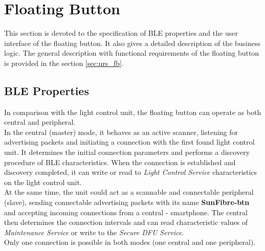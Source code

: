             
            \begin{table}[H]
                \caption{Error states of light control unit.}
                \label{table:error_states}
            \end{table}
            
\section{Floating Button}
    This section is devoted to the specification of BLE properties and the user interface of the floating button. It also gives a detailed description of the business logic. The general description with functional requirements of the floating button is provided in the section \ref{sec:urs_fb}. 

    \subsection{BLE Properties}
        \label{sec:fb_ble_parameters}
        In comparison with the light control unit, the floating button can operate as both central and peripheral.\\
        In the central (master) mode, it behaves as an active scanner, listening for advertising packets and initiating a connection with the first found light control unit. It determines the initial connection parameters and performs a discovery procedure of BLE characteristics. When the connection is established and discovery completed, it can write or read to \textit{Light Control Service} characteristics on the light control unit.\\
        At the same time, the unit could act as a scannable and connectable peripheral (slave), sending connectable advertising packets with its name \textbf{SunFibre-btn} and accepting incoming connections from a central - smartphone. The central then determines the connection intervals and can read characteristic values of \textit{Maintenance Service} or write to the \textit{Secure DFU Service}.\\
        Only one connection is possible in both modes (one central and one peripheral).
        
